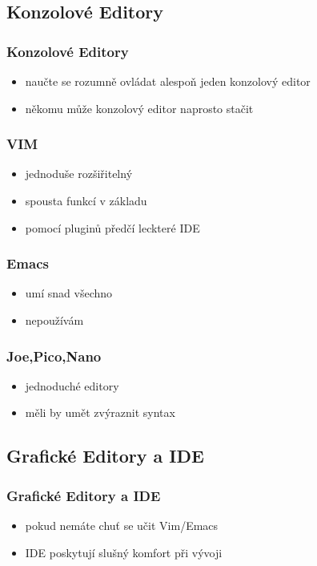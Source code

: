 	\subsection{Konzolové Editory}

	\begin{frame}
		\frametitle{Konzolové Editory}
		\begin{itemize}
			\item{naučte se rozumně ovládat alespoň jeden konzolový editor}
			\item{někomu může konzolový editor naprosto stačit}
		\end{itemize}
	\end{frame}

	\begin{frame}
		\frametitle{VIM}
		\begin{itemize}
			\item{jednoduše rozšiřitelný}
			\item{spousta funkcí v základu}
			\item{pomocí pluginů předčí leckteré IDE}
		\end{itemize}
	\end{frame}

	\begin{frame}
		\frametitle{Emacs}
		\begin{itemize}
			\item{umí snad všechno}
			\item{nepoužívám}
		\end{itemize}
	\end{frame}

	\begin{frame}
		\frametitle{Joe,Pico,Nano}
		\begin{itemize}
			\item{jednoduché editory}
			\item{měli by umět zvýraznit syntax}
		\end{itemize}
	\end{frame}

	\subsection{Grafické Editory a IDE}

	\begin{frame}
		\frametitle{Grafické Editory a IDE}
		\begin{itemize}
			\item{pokud nemáte chuť se učit Vim/Emacs}
			\item{IDE poskytují slušný komfort při vývoji}
		\end{itemize}
	\end{frame}


